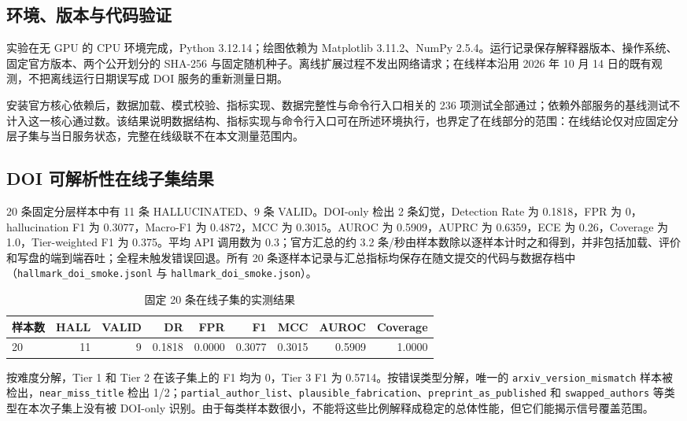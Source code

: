 \documentclass[UTF8,a4paper,11pt]{ctexart}
\begin{document}
\subsection{环境、版本与代码验证}

实验在无 GPU 的 CPU 环境完成，Python 3.12.14；绘图依赖为 Matplotlib 3.11.2、NumPy 2.5.4。运行记录保存解释器版本、操作系统、固定官方版本、两个公开划分的 SHA-256 与固定随机种子。离线扩展过程不发出网络请求；在线样本沿用 2026 年 10 月 14 日的既有观测，不把离线运行日期误写成 DOI 服务的重新测量日期。

安装官方核心依赖后，数据加载、模式校验、指标实现、数据完整性与命令行入口相关的 236 项测试全部通过；依赖外部服务的基线测试不计入这一核心通过数。该结果说明数据结构、指标实现与命令行入口可在所述环境执行，也界定了在线部分的范围：在线结论仅对应固定分层子集与当日服务状态，完整在线级联不在本文测量范围内。

\subsection{DOI 可解析性在线子集结果}

20 条固定分层样本中有 11 条 HALLUCINATED、9 条 VALID。DOI-only 检出 2 条幻觉，Detection Rate 为 0.1818，FPR 为 0，hallucination F1 为 0.3077，Macro-F1 为 0.4872，MCC 为 0.3015。AUROC 为 0.5909，AUPRC 为 0.6359，ECE 为 0.26，Coverage 为 1.0，Tier-weighted F1 为 0.375。平均 API 调用数为 0.3；官方汇总的约 3.2 条/秒由样本数除以逐样本计时之和得到，并非包括加载、评价和写盘的端到端吞吐；全程未触发错误回退。所有 20 条逐样本记录与汇总指标均保存在随文提交的代码与数据存档中（\texttt{hallmark\_doi\_smoke.jsonl} 与 \texttt{hallmark\_doi\_smoke.json}）。

\begin{table}[H]
\centering
\caption{固定 20 条在线子集的实测结果}
\small
\begin{tabular}{lrrrrrrrr}
\toprule
样本数 & HALL & VALID & DR & FPR & F1 & MCC & AUROC & Coverage\\
\midrule
20 & 11 & 9 & 0.1818 & 0.0000 & 0.3077 & 0.3015 & 0.5909 & 1.0000\\
\bottomrule
\end{tabular}
\end{table}

按难度分解，Tier 1 和 Tier 2 在该子集上的 F1 均为 0，Tier 3 F1 为 0.5714。按错误类型分解，唯一的 \texttt{arxiv\_\allowbreak{}version\_\allowbreak{}mismatch} 样本被检出，\texttt{near\_\allowbreak{}miss\_\allowbreak{}title} 检出 1/2；\texttt{partial\_\allowbreak{}author\_\allowbreak{}list}、\texttt{plausible\_\allowbreak{}fabrication}、\texttt{preprint\_\allowbreak{}as\_\allowbreak{}published} 和 \texttt{swapped\_\allowbreak{}authors} 等类型在本次子集上没有被 DOI-only 识别。由于每类样本数很小，不能将这些比例解释成稳定的总体性能，但它们能揭示信号覆盖范围。
\end{document}
